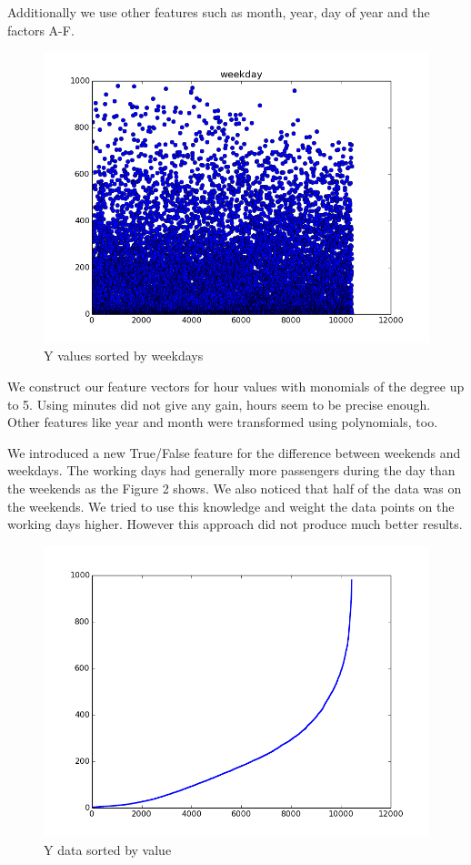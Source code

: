 \documentclass[a4paper, 11pt]{article}
\begin{document}
Additionally we use other features such as month, year, day of year and the factors A-F.

\begin{figure}
\includegraphics[width=0.9\linewidth]{Plots/weekdays} 
\caption{Y values sorted by weekdays}
\end{figure} We construct our feature vectors for hour values with monomials of the degree up to 5. Using minutes did not give any gain, hours seem to be precise enough. Other features like year and month were transformed using polynomials, too.

We introduced a new True/False feature for the difference between weekends and weekdays. The working days had generally more passengers during the day than the weekends as the Figure 2 shows. We also noticed that half of the data was on the weekends. We tried to use this knowledge and weight the data points on the working days higher. However this approach did not produce much better results. 


\begin{figure}
\includegraphics[width=0.9\linewidth]{Plots/data_sorted} 
\caption{Y data sorted by value}
\end{figure}
 
\end{document}
